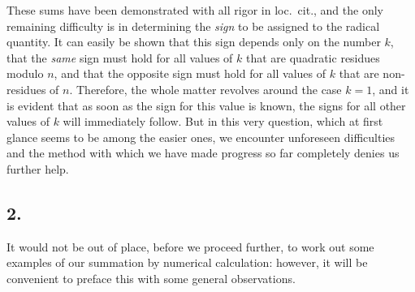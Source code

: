 \documentclass[twoside,12pt]{memoir}
\begin{document}
These sums have been demonstrated with all rigor in {loc.\ cit.}, and the only remaining difficulty is in determining the \textit{sign} to be assigned to the radical quantity. It can easily be shown that this sign depends only on the number \(k\), that the \textit{same} sign must hold for all values of \(k\) that are quadratic residues modulo \(n\), and that the opposite sign must hold for all values of \(k\) that are non-residues of \(n\). Therefore, the whole matter revolves around the case \(k=1\), and it is evident that as soon as the sign for this value is known, the signs for all other values of \(k\) will immediately follow. But in this very question, which at first glance seems to be among the easier ones, we encounter unforeseen difficulties and the method with which we have made progress so far completely denies us further help.
%

\subsection*{2.}
 
It would not be out of place, before we proceed further, to work out some examples of our summation by numerical calculation: however, it will be convenient to preface this with some general observations.
%
\end{document}
